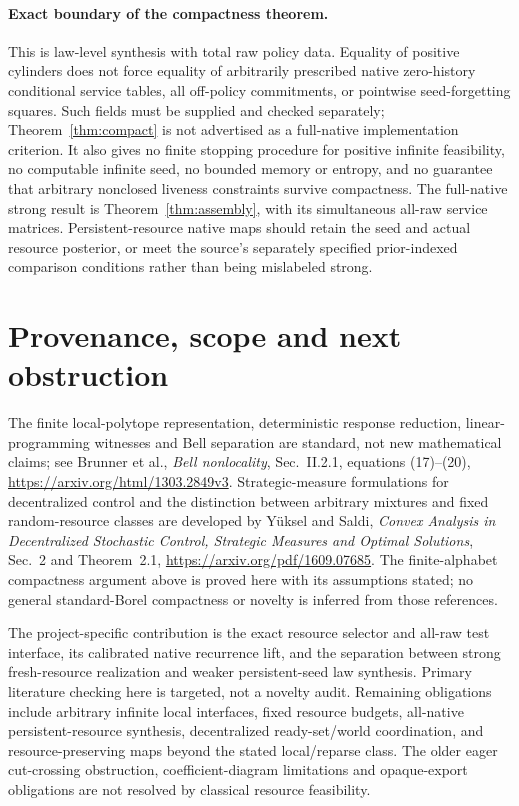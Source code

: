 \documentclass[11pt]{article}
\begin{document}
\paragraph{Exact boundary of the compactness theorem.}
This is law-level synthesis with total raw policy data. Equality of positive cylinders does not force equality of arbitrarily prescribed native zero-history conditional service tables, all off-policy commitments, or pointwise seed-forgetting squares. Such fields must be supplied and checked separately; Theorem~\ref{thm:compact} is not advertised as a full-native implementation criterion. It also gives no finite stopping procedure for positive infinite feasibility, no computable infinite seed, no bounded memory or entropy, and no guarantee that arbitrary nonclosed liveness constraints survive compactness. The full-native strong result is Theorem~\ref{thm:assembly}, with its simultaneous all-raw service matrices. Persistent-resource native maps should retain the seed and actual resource posterior, or meet the source's separately specified prior-indexed comparison conditions rather than being mislabeled strong.

\section{Provenance, scope and next obstruction}
The finite local-polytope representation, deterministic response reduction, linear-programming witnesses and Bell separation are standard, not new mathematical claims; see Brunner et al., \emph{Bell nonlocality}, Sec.~II.2.1, equations (17)--(20), \url{https://arxiv.org/html/1303.2849v3}. Strategic-measure formulations for decentralized control and the distinction between arbitrary mixtures and fixed random-resource classes are developed by Y\"uksel and Saldi, \emph{Convex Analysis in Decentralized Stochastic Control, Strategic Measures and Optimal Solutions}, Sec.~2 and Theorem~2.1, \url{https://arxiv.org/pdf/1609.07685}. The finite-alphabet compactness argument above is proved here with its assumptions stated; no general standard-Borel compactness or novelty is inferred from those references.

The project-specific contribution is the exact resource selector and all-raw test interface, its calibrated native recurrence lift, and the separation between strong fresh-resource realization and weaker persistent-seed law synthesis. Primary literature checking here is targeted, not a novelty audit. Remaining obligations include arbitrary infinite local interfaces, fixed resource budgets, all-native persistent-resource synthesis, decentralized ready-set/world coordination, and resource-preserving maps beyond the stated local/reparse class. The older eager cut-crossing obstruction, coefficient-diagram limitations and opaque-export obligations are not resolved by classical resource feasibility.
\end{document}
